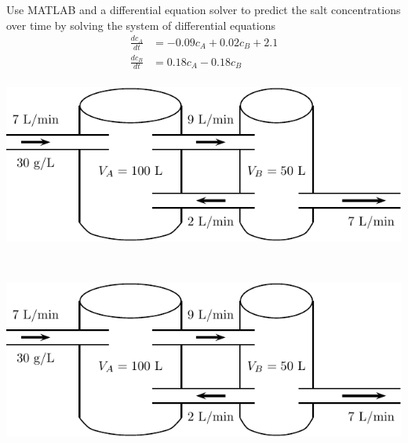 \newpage

\begin{minipage}[h]{0.5\linewidth}
  \vspace{0pt} \problem Use MATLAB and a differential equation solver
  to predict the salt concentrations over time by solving the system
  of differential equations
  \begin{align*}
    \frac{dc_A}{dt} & = -0.09 c_A + 0.02 c_B + 2.1 \\
    \frac{dc_B}{dt} & = 0.18 c_A - 0.18 c_B \\
  \end{align*}
\end{minipage} \hfill
\begin{minipage}[h]{0.45\linewidth}
\vspace{0pt}
\includegraphics[width=1.0\linewidth]{graphics/notes_09_tanks2}
\end{minipage}


\newpage


~\hfill \begin{minipage}[h]{0.45\linewidth}
\vspace{0pt}
\includegraphics[width=1.0\linewidth]{graphics/notes_09_tanks2}
\end{minipage}








